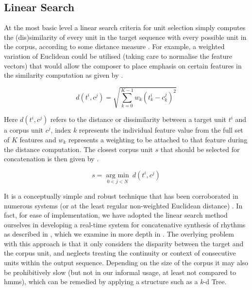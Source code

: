 {{{{{{{\subsection{Linear Search}

At the most basic level a linear search criteria for unit selection simply computes the (dis)similarity of every unit in the target sequence with every possible unit in the corpus, according to some distance measure \citep{Schwarz2011}. For example, a weighted variation of Euclidean could be utilised (taking care to normalise the feature vectors) that would allow the composer to place emphasis on certain features in the similarity computation as given by .

\begin{equation}
\label{eq:linear_search}
d(t^i, c^j) = \sqrt{\sum_{k=0}^{K-1}w_k(t^i_k-c^j_k)^2}
\end{equation}

Here $d(t^i, c^j)$ refers to the distance or dissimilarity between a target unit $t^i$ and a corpus unit $c^j$, index $k$ represents the individual feature value from the full set of $K$ features and $w_k$ represents a weighting to be attached to that feature during the distance computation. The closest corpus unit $s$ that should be selected for concatenation is then given by .

\begin{equation}
\label{eq:linear_search_argmin}
s = \operatorname*{arg\ min}_{0<j<N}\ d(t^i, c^j)
\end{equation}

 It is a conceptually simple and robust technique that has been corroborated in numerous systems (or at the least regular non-weighted Euclidean distance) \citep{Dannenberg2006, Maestre2006, Sturm2006, Collins2007,  Stoll2013}. In fact, for ease of implementation, we have adopted the linear search method ourselves in developing a real-time system for concatenative synthesis of rhythms as described in \cite{Nuanain2016a, ONuanain2017a}, which we examine in more depth in . The overlying problem with this approach is that it only considers the disparity between the target and the corpus unit, and neglects treating the continuity or context of consecutive units within the output sequence. Depending on the size of the corpus it may also be prohibitively slow (but not in our informal usage, at least not compared to \acrshort{hmm}s), which can be remedied by applying a structure such as a \textit{k}-d Tree.

}}}}}}}
